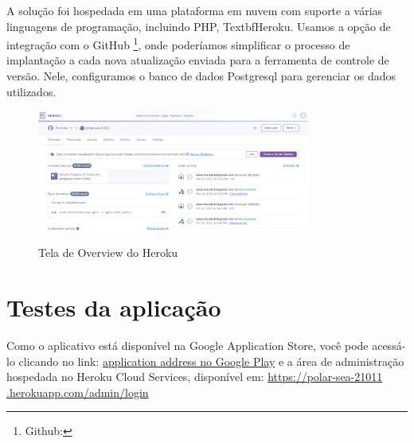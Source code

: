 A solução foi hospedada em uma plataforma em nuvem com suporte a várias linguagens de programação, incluindo PHP, Textbf{Heroku}. Usamos a opção de integração com o GitHub \footnote{Github: }, onde poderíamos simplificar o processo de implantação a cada nova atualização enviada para a ferramenta de controle de versão. Nele, configuramos o banco de dados Postgresql para gerenciar os dados utilizados.

\begin{figure}[H]
	\centering
	\caption{Tela de Overview do Heroku}
	\includegraphics[width=0.8\textwidth]{./04-figuras/area-administrativa/heroku.png}
	\label{fig:heroku}
\end{figure}






\section{Testes da aplicação}
Como o aplicativo está disponível na Google Application Store, você pode acessá-lo clicando no link: \href{https://play.google.com/store/apps/details?id=com.unifap.caronaeunifap}{application address no Google Play} e a área de administração hospedada no Heroku Cloud Services, disponível em: \href{https://polar-sea-21011.herokuapp.com/admin/login}{https://polar-sea-21011 .herokuapp.com/admin/login}

